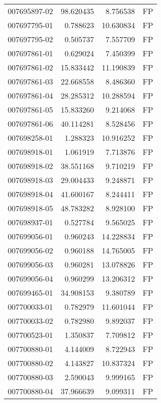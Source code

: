 \begin{tabular}{lrrl}
007695897-02 &   98.620435 &       8.756538 &   FP \\
007697795-01 &    0.788623 &      10.630834 &   FP \\
007697795-02 &    0.505737 &       7.557709 &   FP \\
007697861-01 &    0.629024 &       7.450399 &   FP \\
007697861-02 &   15.833442 &      11.190839 &   FP \\
007697861-03 &   22.668558 &       8.486360 &   FP \\
007697861-04 &   28.285312 &      10.288594 &   FP \\
007697861-05 &   15.833260 &       9.214068 &   FP \\
007697861-06 &   40.114281 &       8.528456 &   FP \\
007698258-01 &    1.288323 &      10.916252 &   FP \\
007698918-01 &    1.061919 &       7.713876 &   FP \\
007698918-02 &   38.551168 &       9.710219 &   FP \\
007698918-03 &   29.004433 &       9.248871 &   FP \\
007698918-04 &   41.600167 &       8.244411 &   FP \\
007698918-05 &   48.783282 &       8.928100 &   FP \\
007698937-01 &    0.527784 &       9.565025 &   FP \\
007699056-01 &    0.960243 &      14.228834 &   FP \\
007699056-02 &    0.960188 &      14.765005 &   FP \\
007699056-03 &    0.960281 &      13.078826 &   FP \\
007699056-04 &    0.960299 &      13.206312 &   FP \\
007699465-01 &   34.908153 &       9.380789 &   FP \\
007700033-01 &    0.782979 &      11.601044 &   FP \\
007700033-02 &    0.782980 &       9.892037 &   FP \\
007700523-01 &    1.350837 &       7.709812 &   FP \\
007700880-01 &    4.144009 &       8.722943 &   FP \\
007700880-02 &    4.143827 &      10.837324 &   FP \\
007700880-03 &    2.590043 &       9.999165 &   FP \\
007700880-04 &   37.966639 &       9.099311 &   FP \\

\end{tabular}
